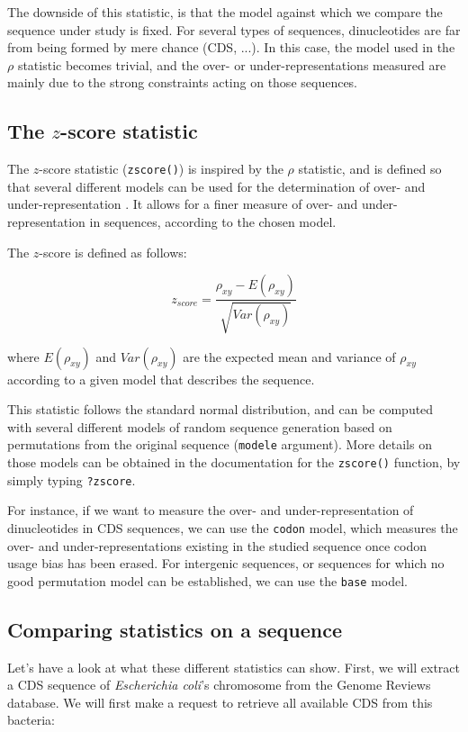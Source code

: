 \documentclass{article}
\begin{document}
The downside of this statistic, is that the model against which we
compare the sequence under study is fixed. For several types of
sequences, dinucleotides are far from being formed by mere chance
(CDS, ...). In this case, the model used in the $\rho$ statistic
becomes trivial, and the over- or under-representations measured are
mainly due to the strong constraints acting on those sequences.

\subsection{The $z$-score statistic}

The $z$-score statistic (\texttt{zscore()}) is inspired by the
$\rho$ statistic, and is defined so that several different models can
be used for the determination of over- and under-representation
\cite{UV}. It allows for a finer measure of over- and
under-representation in sequences, according to the chosen model.

The $z$-score is defined as follows:

$$z_{score}=\frac{\rho_{xy}-E(\rho_{xy})}{\sqrt{Var(\rho_{xy})}}$$

where $E(\rho_{xy})$ and $Var(\rho_{xy})$ are the expected mean and
variance of $\rho_{xy}$ according to a given model that describes the
sequence.

This statistic follows the standard normal distribution, and can be
computed with several different models of random sequence generation
based on permutations from the original sequence (\texttt{modele}
argument). More details on those models can be obtained in the
documentation for the \texttt{zscore()} function, by simply typing
\texttt{?zscore}.

For instance, if we want to measure the over- and under-representation
of dinucleotides in CDS sequences, we can use the \texttt{codon}
model, which measures the over- and under-representations existing in
the studied sequence once codon usage bias has been erased. For
intergenic sequences, or sequences for which no good permutation model
can be established, we can use the \texttt{base} model. 

\subsection{Comparing statistics on a sequence}

Let's have a look at what these different statistics can show. First,
we will extract a CDS sequence of \textit{Escherichia coli}'s
chromosome from the Genome Reviews database. We will first make a
request to retrieve all available CDS from this bacteria:
\end{document}
